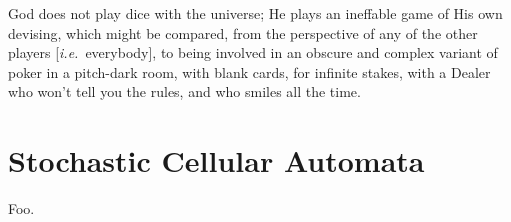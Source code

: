 
\begin{savequote}[99mm]
God does not play dice with the universe; He plays an ineffable game of His own devising, which might be compared, from the perspective of any of the other players [{\it i.e.}\ everybody], to being involved in an obscure and complex variant of poker in a pitch-dark room, with blank cards, for infinite stakes, with a Dealer who won't tell you the rules, and who smiles all the time.
\end{savequote}

\chapter{Stochastic Cellular Automata}

Foo.